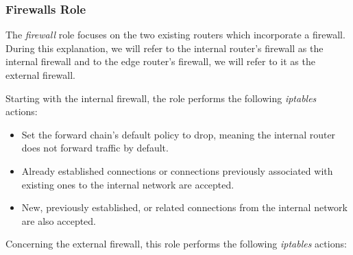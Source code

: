 \subsubsection{Firewalls Role} \label{sec:ansible_firewalls_role}

The \textit{firewall} role focuses on the two existing routers which incorporate a firewall. During this explanation, we will refer to the internal router's firewall as the internal firewall and to the edge router's firewall, we will refer to it as the external firewall. 

Starting with the internal firewall, the role performs the following \textit{iptables} actions:

\begin{itemize}
    \item Set the forward chain's default policy to drop, meaning the internal router does not forward traffic by default.
    \item Already established connections or connections previously associated with existing ones to the internal network are accepted.
    \item New, previously established, or related connections from the internal network are also accepted.
\end{itemize}

Concerning the external firewall, this role performs the following \textit{iptables} actions:

